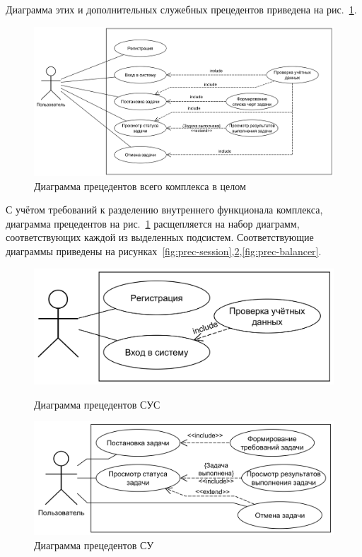 \documentclass[a4paper,12pt]{report}
\numberwithin{equation}{section}
\begin{document}
Диаграмма этих и дополнительных служебных прецедентов приведена на рис.~\ref{fig:prec-common}.

\begin{figure}[b]
  \centering
  \includegraphics[width=.9\linewidth]{diagrams/common/usecase}
  \caption{Диаграмма прецедентов всего комплекса в целом}
  \label{fig:prec-common}
\end{figure}

С учётом требований к разделению внутреннего функционала комплекса, диаграмма прецедентов на рис.~\ref{fig:prec-common}
расщепляется на набор диаграмм, соответствующих каждой из выделенных подсистем.
Соответствующие диаграммы приведены на рисунках~\ref{fig:prec-session},\ref{fig:prec-logic},\ref{fig:prec-balancer}.

\begin{figure}
  \centering
  \begin{minipage}{.49\linewidth}
    \centering
    \includegraphics[width=\linewidth]{diagrams/session/usecase}
    \caption{Диаграмма прецедентов СУС}
    \label{fig:prec-session}
  \end{minipage}
  \hfill
  \begin{minipage}{.49\linewidth}
    \centering
    \includegraphics[width=\linewidth]{diagrams/logic/usecase}
    \caption{Диаграмма прецедентов СУ}
    \label{fig:prec-logic}
  \end{minipage}  
\end{figure}
\end{document}
